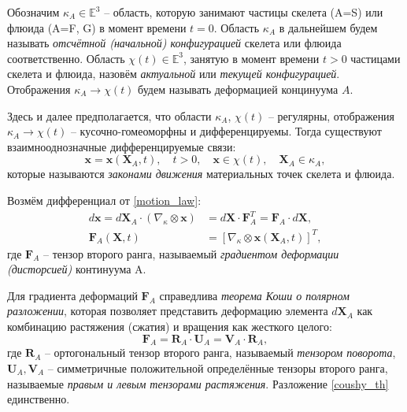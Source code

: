	Обозначим $\kappa_A \in \mathbb{E}^3$ -- область, которую занимают частицы скелета (A=S) или флюида (A=F, G) в момент времени $t=0$. Область $\kappa_A$ в дальнейшем будем называть \textit{отсчётной (начальной) конфигурацией} скелета или флюида соответственно. 
	Область $\chi(t) \in \mathbb{E}^3$, занятую в момент времени $t > 0$ частицами скелета и флюида, назовём \textit{актуальной} или \textit{текущей конфигурацией}. Отображения $\kappa_A \to \chi(t)$ будем называть деформацией концинуума $A$.
	
	Здесь и далее предполагается, что области $\kappa_A$, $\chi(t)$ -- регулярны, отображения $\kappa_A \to \chi(t)$ -- кусочно-гомеоморфны и дифференцируемы. Тогда существуют взаимнооднозначные дифференцируемые связи:
\begin{equation}
	\label{motion_law}
	\boldsymbol{x} = \boldsymbol{x}(\boldsymbol{X}_A, t), \quad t > 0,\quad \boldsymbol{x} \in \chi(t), \quad \boldsymbol{X}_A \in \kappa_A,
\end{equation}
	которые называются \textit{законами движения} материальных точек скелета и флюида.
	
	Возмём дифференциал от \eqref{motion_law}:
\begin{align}
	\label{gradient}
	d\boldsymbol{x} = d\boldsymbol{X}_A \cdot \left(\nabla_{\kappa} \otimes \boldsymbol{x} \right) &= d\boldsymbol{X} \cdot \boldsymbol{F}_A^T = \boldsymbol{F}_A \cdot d\boldsymbol{X},\nonumber\\
	\boldsymbol{F}_A(\boldsymbol{X}, t) &= \left[\nabla_{\kappa} \otimes \boldsymbol{x}(\boldsymbol{X}_A, t)\right]^T,
\end{align}
	где $\boldsymbol{F}_A$ -- тензор второго ранга, называемый \textit{градиентом деформации (дисторсией)} континуума A.
	
	Для градиента деформаций $\textbf{F}_A$ справедлива \textit{теорема Коши о полярном разложении}, которая позволяет представить деформацию элемента $d\boldsymbol{X}_A$ как комбинацию растяжения (сжатия) и вращения как жесткого целого:
\begin{equation}
	\label{coushy_th}
	\boldsymbol{F}_A = \boldsymbol{R}_A \cdot \boldsymbol{U}_A = \boldsymbol{V}_A \cdot \boldsymbol{R}_A,
\end{equation}
	где $\boldsymbol{R}_A$ -- ортогональный тензор второго ранга, называемый \textit{тензором поворота},
	$\boldsymbol{U}_A, \boldsymbol{V}_A$ -- симметричные положительной определённые тензоры второго ранга, называемые \textit{правым и левым тензорами растяжения}. Разложение \eqref{coushy_th} единственно.
	
